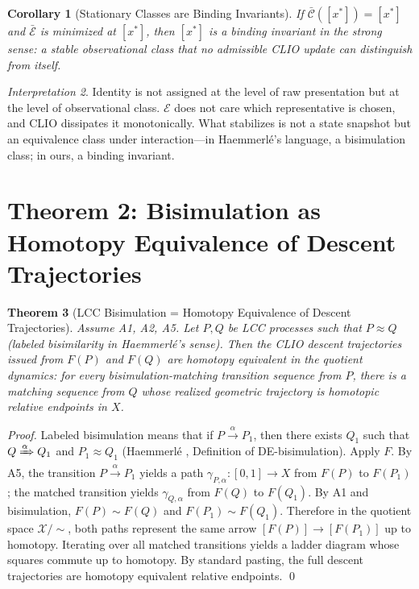 \documentclass[11pt, letterpaper]{article}
\theoremstyle{plain}
\newtheorem{theorem}{Theorem}[section]
\newtheorem{corollary}[theorem]{Corollary}
\theoremstyle{definition}
\theoremstyle{remark}
\newtheorem{interpretation}[theorem]{Interpretation}
\newcommand{\CC}{\mathcal{C}}
\newcommand{\EE}{\mathcal{E}}
\begin{document}
\begin{corollary}[Stationary Classes are Binding Invariants]
If $\bar{\CC}([x^*]) = [x^*]$ and $\bar{\EE}$ is minimized at $[x^*]$, then $[x^*]$
is a binding invariant in the strong sense: a stable observational class that no
admissible CLIO update can distinguish from itself.
\end{corollary}

\begin{interpretation}
Identity is not assigned at the level of raw presentation but at the level of
observational class. $\EE$ does not care which representative is chosen, and CLIO
dissipates it monotonically. What stabilizes is not a state snapshot but an equivalence
class under interaction---in Haemmerl\'e's language, a bisimulation class; in ours, a
binding invariant.
\end{interpretation}

\section{Theorem 2: Bisimulation as Homotopy Equivalence of Descent Trajectories}

\begin{theorem}[LCC Bisimulation = Homotopy Equivalence of Descent Trajectories]
\label{thm:bisim-homotopy}
Assume A1, A2, A5. Let $P, Q$ be LCC processes such that $P \approx Q$ (labeled
bisimilarity in Haemmerl\'e's sense). Then the CLIO descent trajectories issued from
$F(P)$ and $F(Q)$ are homotopy equivalent in the quotient dynamics: for every
bisimulation-matching transition sequence from $P$, there is a matching sequence from
$Q$ whose realized geometric trajectory is homotopic relative endpoints in $X$.
\end{theorem}

\begin{proof}
Labeled bisimulation means that if $P \xrightarrow{\alpha} P_1$, then there exists
$Q_1$ such that $Q \xRightarrow{\alpha} Q_1$ and $P_1 \approx Q_1$ (Haemmerl\'e
\cite{haemmerle2011}, Definition of DE-bisimulation). Apply $F$. By A5, the transition
$P \xrightarrow{\alpha} P_1$ yields a path $\gamma_{P,\alpha}: [0,1] \to X$ from
$F(P)$ to $F(P_1)$; the matched transition yields $\gamma_{Q,\alpha}$ from $F(Q)$ to
$F(Q_1)$. By A1 and bisimulation, $F(P) \sim F(Q)$ and $F(P_1) \sim F(Q_1)$.
Therefore in the quotient space $\mathcal{X}/{\sim}$, both paths represent the same
arrow $[F(P)] \to [F(P_1)]$ up to homotopy. Iterating over all matched transitions
yields a ladder diagram whose squares commute up to homotopy. By standard pasting, the
full descent trajectories are homotopy equivalent relative endpoints. \qed
\end{proof}
\end{document}
